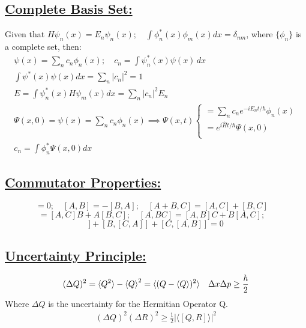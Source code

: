 \documentclass[a4paper,12pt]{article}
\begin{document}
\subsection*{\underline{Complete Basis Set:}}
Given that $H\psi_n(x)=E_n\psi_n(x);\quad \int\phi^*_n(x)\phi_m(x)dx=\delta_{nm}$, where $\{\phi_n\}$ is a complete set, then:
\begin{gather}
    \psi(x)=\sum_nc_n\phi_n(x);\quad c_n=\int\psi^*_n(x)\psi(x)\,dx\\
    \int\psi^*(x)\psi(x)dx=\sum_n|c_n|^2=1\\
    E=\int\psi^*_n(x)H\psi_m(x)dx=\sum_n|c_n|^2E_n\\
    \Psi(x,0)=\psi(x)=\sum_nc_n\phi_n(x)\implies\Psi(x,t)
    \begin{cases}
        =\sum_nc_ne^{-iE_nt/\hbar}\phi_n(x) \\
        =e^{i\hat H t/\hbar}\Psi(x,0)       \\
    \end{cases}
    \\ c_n=\int\phi_n^*\Psi(x,0)dx
\end{gather}

\subsection*{\underline{Commutator Properties:}}
\begin{equation}
    [A,A]=0;\quad
    [A,B]=-[B,A];\quad
    [A+B,C]=[A,C]+[B,C]\quad
\end{equation}
\begin{equation}
    [AB,C]=[A,C]B+A[B,C];\quad
    [A,BC]=[A,B]C+B[A,C];\quad
\end{equation}
\begin{equation}
    [A,[B,C]]+[B,[C,A]]+[C,[A,B]]=0
\end{equation}

\newpage
\subsection*{\underline{Uncertainty Principle:}}
\begin{align}
     & (\Delta Q)^2 = \braket{Q^2} - \braket{Q}^2 = \braket{(Q-\braket{Q})^2}
     & \Delta x \Delta p \geq \frac{\hbar}{2}
\end{align}
Where $\Delta Q$ is the uncertainty for the Hermitian Operator Q.
\begin{align}
    (\Delta{Q})^2 (\Delta{R})^2 \ge \frac{1}{2} \left| \langle [Q, R] \rangle \right| ^2
\end{align}
\end{document}
